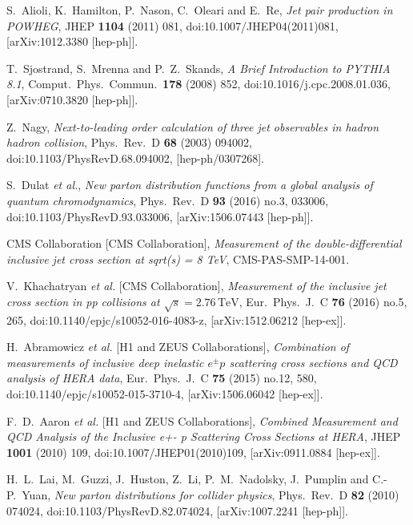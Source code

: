 \documentclass{PoS}
\begin{document}
\begin{thebibliography}{99}
  S.~Alioli, K.~Hamilton, P.~Nason, C.~Oleari and E.~Re,
  {\it Jet pair production in POWHEG},
  JHEP {\bf 1104} (2011) 081,
  doi:10.1007/JHEP04(2011)081,
  [arXiv:1012.3380 [hep-ph]].

  T.~Sjostrand, S.~Mrenna and P.~Z.~Skands,
  {\it A Brief Introduction to PYTHIA 8.1},
  Comput.\ Phys.\ Commun.\  {\bf 178} (2008) 852,
  doi:10.1016/j.cpc.2008.01.036,
  [arXiv:0710.3820 [hep-ph]].

  Z.~Nagy,
  {\it Next-to-leading order calculation of three jet observables in hadron hadron collision},
  Phys.\ Rev.\ D {\bf 68} (2003) 094002,
  doi:10.1103/PhysRevD.68.094002,
  [hep-ph/0307268].

  S.~Dulat {\it et al.},
  {\it New parton distribution functions from a global analysis of quantum chromodynamics},
  Phys.\ Rev.\ D {\bf 93} (2016) no.3,  033006,
  doi:10.1103/PhysRevD.93.033006,
  [arXiv:1506.07443 [hep-ph]].

  CMS Collaboration [CMS Collaboration],
  {\it Measurement of the double-differential inclusive jet cross section at sqrt(s) = 8 TeV},
  CMS-PAS-SMP-14-001.

  V.~Khachatryan {\it et al.} [CMS Collaboration],
  {\it Measurement of the inclusive jet cross section in pp collisions at $\sqrt{s} = 2.76\,\text {TeV}$},
  Eur.\ Phys.\ J.\ C {\bf 76} (2016) no.5,  265,
  doi:10.1140/epjc/s10052-016-4083-z,
  [arXiv:1512.06212 [hep-ex]].

  H.~Abramowicz {\it et al.} [H1 and ZEUS Collaborations],
  {\it Combination of measurements of inclusive deep inelastic ${e^{\pm }p}$ scattering cross sections and QCD analysis of HERA data},
  Eur.\ Phys.\ J.\ C {\bf 75} (2015) no.12,  580,
  doi:10.1140/epjc/s10052-015-3710-4,
  [arXiv:1506.06042 [hep-ex]].

  F.~D.~Aaron {\it et al.} [H1 and ZEUS Collaborations],
  {\it Combined Measurement and QCD Analysis of the Inclusive e+- p Scattering Cross Sections at HERA},
  JHEP {\bf 1001} (2010) 109,
  doi:10.1007/JHEP01(2010)109,
  [arXiv:0911.0884 [hep-ex]].

  H.~L.~Lai, M.~Guzzi, J.~Huston, Z.~Li, P.~M.~Nadolsky, J.~Pumplin and C.-P.~Yuan,
  {\it New parton distributions for collider physics},
  Phys.\ Rev.\ D {\bf 82} (2010) 074024,
  doi:10.1103/PhysRevD.82.074024,
  [arXiv:1007.2241 [hep-ph]].


\end{thebibliography}
\end{document}
